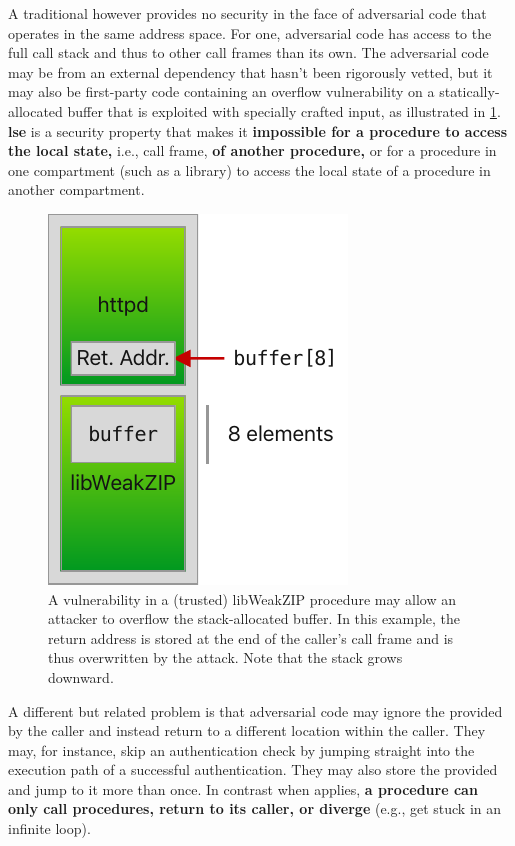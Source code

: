 \documentclass[main.tex]{subfiles}
\begin{document}
A traditional  however provides no security in the face of adversarial code that operates in the same address space. For one, adversarial code has access to the full call stack and thus to other call frames than its own. The adversarial code may be from an external dependency that hasn't been rigorously vetted, but it may also be first-party code containing an overflow vulnerability on a statically-allocated buffer that is exploited with specially crafted input, as illustrated in \cref{fig:buffoverflow}. \textbf{\Gls{lse}} is a security property that makes it \textbf{impossible for a procedure to access the local state,} i.e., call frame, \textbf{of another procedure,} or for a procedure in one compartment (such as a library) to access the local state of a procedure in another compartment.

\begin{figure}
	\begin{center}
		\includegraphics{Images/Buffer Overflow.pdf}
	\end{center}
	\caption{A vulnerability in a (trusted) libWeakZIP procedure may allow an attacker to overflow the stack-allocated buffer. In this example, the return address is stored at the end of the caller's call frame and is thus overwritten by the attack. Note that the stack grows downward.}
	\label{fig:buffoverflow}
\end{figure}

A different but related problem is that adversarial code may ignore the  provided by the caller and instead return to a different location within the caller. They may, for instance, skip an authentication check by jumping straight into the execution path of a successful authentication. They may also store the provided  and jump to it more than once. In contrast when \textbf{} applies, \textbf{a procedure can only call procedures, return to its caller, or diverge} (e.g., get stuck in an infinite loop).
\end{document}

